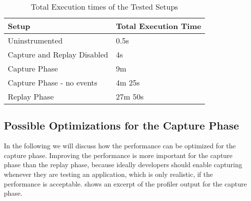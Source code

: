 \begin{center}
 \begin{table}
	\begin{tabular}[ht]{|l|l|} 
	\hline
	\textbf{Setup} & \textbf{Total Execution Time} \\ \hline
	Uninstrumented & 0.5s \\ \hline 
	Capture and Replay Disabled & 4s \\ \hline
	Capture Phase & 9m \\ \hline
	Capture Phase - no events & 4m 25s \\ \hline
	Replay Phase & 27m 50s \\ \hline
	\end{tabular}
 \caption{Total Execution times of the Tested Setups}
 \label{tbl:execution_times}
 \end{table} 
\end{center}

\subsection{Possible Optimizations for the Capture Phase}
In the following we will discuss how the performance can be optimized for the capture phase. Improving the performance is more important for the capture phase than the replay phase, because ideally developers should enable capturing whenever they are testing an application, which is only realistic, if the performance is acceptable.  shows an excerpt of the profiler output for the capture phase.


